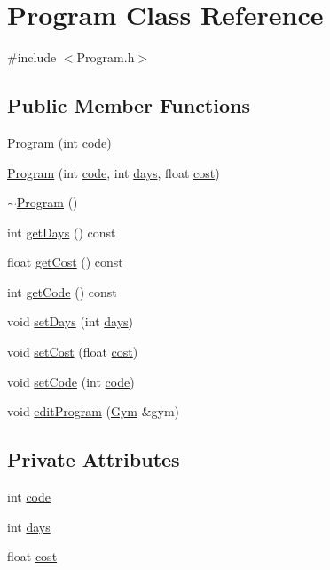 \hypertarget{classProgram}{}\section{Program Class Reference}
\label{classProgram}


{\ttfamily \#include $<$Program.\+h$>$}

\subsection*{Public Member Functions}
\begin{DoxyCompactItemize}
\item 
\hyperlink{classProgram_a77354e42fdc0bc2e020aa1ea43204838}{Program} (int \hyperlink{classProgram_a95ee4089c38ba823287d4d9a4057cff4}{code})
\item 
\hyperlink{classProgram_a2ec985383c63de0819b0fa45ed924d8d}{Program} (int \hyperlink{classProgram_a95ee4089c38ba823287d4d9a4057cff4}{code}, int \hyperlink{classProgram_a3b0559f1f16d662f885851113a31a3a6}{days}, float \hyperlink{classProgram_a59057576469cca4e1b012010af18538c}{cost})
\item 
\hyperlink{classProgram_a986aef1c50e1d338a3315a47ba6df549}{$\sim$\+Program} ()
\item 
int \hyperlink{classProgram_a6ad5b040a2b51e7aaec0c0dfa06df151}{get\+Days} () const 
\item 
float \hyperlink{classProgram_a50fdcb0e6e8389a98d80e51f85e016e8}{get\+Cost} () const 
\item 
int \hyperlink{classProgram_aa6b4bdc285eb9b8461b6bb1b7319dcc7}{get\+Code} () const 
\item 
void \hyperlink{classProgram_ab80d635627245152d90a8be1857d0cb9}{set\+Days} (int \hyperlink{classProgram_a3b0559f1f16d662f885851113a31a3a6}{days})
\item 
void \hyperlink{classProgram_a22a51b02ac6c4c880a3d932d1d987bd5}{set\+Cost} (float \hyperlink{classProgram_a59057576469cca4e1b012010af18538c}{cost})
\item 
void \hyperlink{classProgram_acae5e9997c86dca01f4f2f08b7fbed83}{set\+Code} (int \hyperlink{classProgram_a95ee4089c38ba823287d4d9a4057cff4}{code})
\item 
void \hyperlink{classProgram_aabc3da82094e4879cee242dd5cc2ad0f}{edit\+Program} (\hyperlink{classGym}{Gym} \&gym)
\end{DoxyCompactItemize}
\subsection*{Private Attributes}
\begin{DoxyCompactItemize}
\item 
int \hyperlink{classProgram_a95ee4089c38ba823287d4d9a4057cff4}{code}
\item 
int \hyperlink{classProgram_a3b0559f1f16d662f885851113a31a3a6}{days}
\item 
float \hyperlink{classProgram_a59057576469cca4e1b012010af18538c}{cost}
\end{DoxyCompactItemize}
